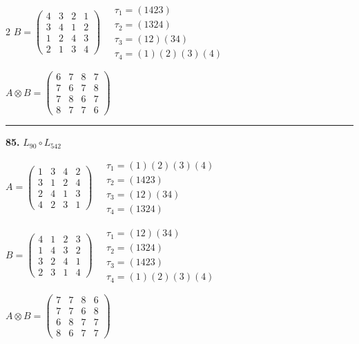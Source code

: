 \begin{multicols}{2}
$B = \begin{pmatrix} 4 & 3 & 2 & 1 \\ 3 & 4 & 1 & 2 \\ 1 & 2 & 4 & 3 \\ 2 & 1 & 3 & 4 \end{pmatrix} \quad \begin{matrix} \tau_{1}=(1 4 2 3) \\ \tau_{2}=(1 3 2 4) \\ \tau_{3}=(1 2)(3 4) \\ \tau_{4}=(1)(2)(3)(4) \end{matrix}$

$A \otimes B = \begin{pmatrix} 6 & 7 & 8 & 7 \\ 7 & 6 & 7 & 8 \\ 7 & 8 & 6 & 7 \\ 8 & 7 & 7 & 6 \end{pmatrix}$

\vspace{0.3em}
\hrule
\vspace{0.3em}

\noindent\textbf{85.} $L_{90} \circ L_{542}$

$A = \begin{pmatrix} 1 & 3 & 4 & 2 \\ 3 & 1 & 2 & 4 \\ 2 & 4 & 1 & 3 \\ 4 & 2 & 3 & 1 \end{pmatrix} \quad \begin{matrix} \tau_{1}=(1)(2)(3)(4) \\ \tau_{2}=(1 4 2 3) \\ \tau_{3}=(1 2)(3 4) \\ \tau_{4}=(1 3 2 4) \end{matrix}$

$B = \begin{pmatrix} 4 & 1 & 2 & 3 \\ 1 & 4 & 3 & 2 \\ 3 & 2 & 4 & 1 \\ 2 & 3 & 1 & 4 \end{pmatrix} \quad \begin{matrix} \tau_{1}=(1 2)(3 4) \\ \tau_{2}=(1 3 2 4) \\ \tau_{3}=(1 4 2 3) \\ \tau_{4}=(1)(2)(3)(4) \end{matrix}$

$A \otimes B = \begin{pmatrix} 7 & 7 & 8 & 6 \\ 7 & 7 & 6 & 8 \\ 6 & 8 & 7 & 7 \\ 8 & 6 & 7 & 7 \end{pmatrix}$


\end{multicols}
